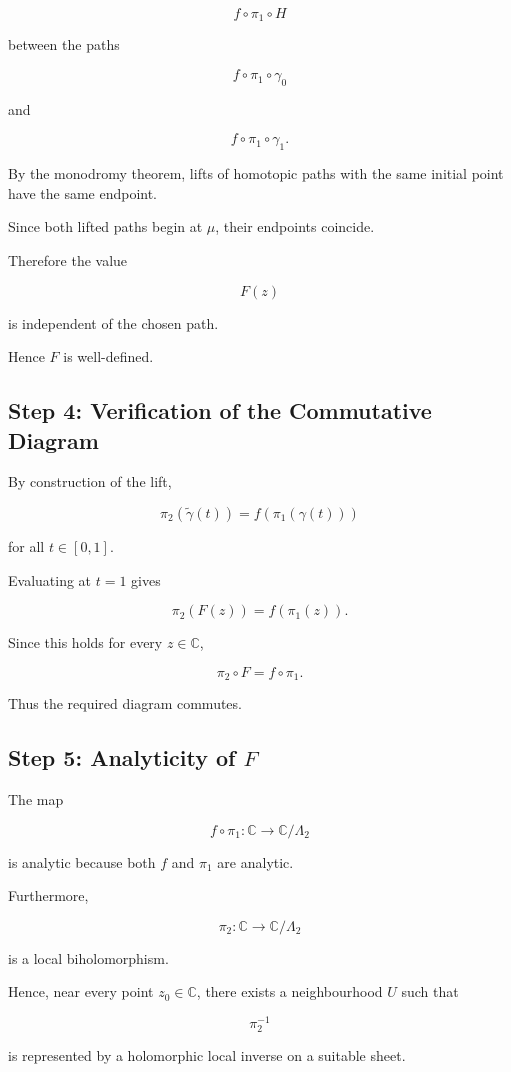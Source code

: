 \documentclass[12pt,a4paper]{article}
\theoremstyle{notespace}
\begin{document}
\[
f\circ\pi_1\circ H
\]

between the paths

\[
f\circ\pi_1\circ\gamma_0
\]

and

\[
f\circ\pi_1\circ\gamma_1.
\]

By the monodromy theorem, lifts of homotopic paths with the same initial point have the same endpoint.

Since both lifted paths begin at \(\mu\), their endpoints coincide.

Therefore the value

\[
F(z)
\]

is independent of the chosen path.

Hence \(F\) is well-defined.

\subsection{Step 4: Verification of the Commutative Diagram}

By construction of the lift,

\[
\pi_2(\widetilde{\gamma}(t))
=
f(\pi_1(\gamma(t)))
\]

for all \(t\in[0,1]\).

Evaluating at \(t=1\) gives

\[
\pi_2(F(z))
=
f(\pi_1(z)).
\]

Since this holds for every \(z\in\mathbb C\),

\[
\boxed{
	\pi_2\circ F
	=
	f\circ\pi_1.
}
\]

Thus the required diagram commutes.

\subsection{Step 5: Analyticity of \(F\)}

The map

\[
f\circ\pi_1:\mathbb C\to\mathbb C/\Lambda_2
\]

is analytic because both \(f\) and \(\pi_1\) are analytic.

Furthermore,

\[
\pi_2:\mathbb C\to\mathbb C/\Lambda_2
\]

is a local biholomorphism.

Hence, near every point \(z_0\in\mathbb C\), there exists a neighbourhood \(U\) such that

\[
\pi_2^{-1}
\]

is represented by a holomorphic local inverse on a suitable sheet.
\end{document}
